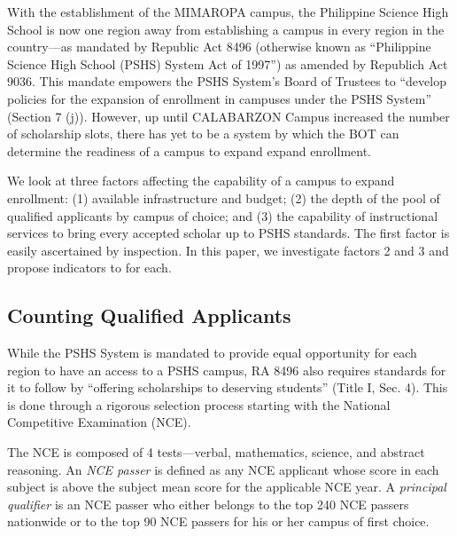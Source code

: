 \documentclass[]{article}
\begin{document}
With the establishment of the MIMAROPA campus, the Philippine Science
High School is now one region away from establishing a campus in every
region in the country---as mandated by Republic Act 8496 (otherwise
known as ``Philippine Science High School (PSHS) System Act of 1997'')
as amended by Republich Act 9036. This mandate empowers the PSHS
System's Board of Trustees to ``develop policies for the expansion of
enrollment in campuses under the PSHS System'' (Section 7 (j)). However,
up until CALABARZON Campus increased the number of scholarship slots,
there has yet to be a system by which the BOT can determine the
readiness of a campus to expand expand enrollment.

We look at three factors affecting the capability of a campus to expand
enrollment: (1) available infrastructure and budget; (2) the depth of
the pool of qualified applicants by campus of choice; and (3) the
capability of instructional services to bring every accepted scholar up
to PSHS standards. The first factor is easily ascertained by inspection.
In this paper, we investigate factors 2 and 3 and propose indicators to
for each.

\hypertarget{counting-qualified-applicants}{%
\subsection{Counting Qualified
Applicants}\label{counting-qualified-applicants}}

While the PSHS System is mandated to provide equal opportunity for each
region to have an access to a PSHS campus, RA 8496 also requires
standards for it to follow by ``offering scholarships to deserving
students'' (Title I, Sec. 4). This is done through a rigorous selection
process starting with the National Competitive Examination (NCE).

The NCE is composed of 4 tests---verbal, mathematics, science, and
abstract reasoning. An \emph{NCE passer} is defined as any NCE applicant
whose score in each subject is above the subject mean score for the
applicable NCE year. A \emph{principal qualifier} is an NCE passer who
either belongs to the top 240 NCE passers nationwide or to the top 90
NCE passers for his or her campus of first choice.
\end{document}
